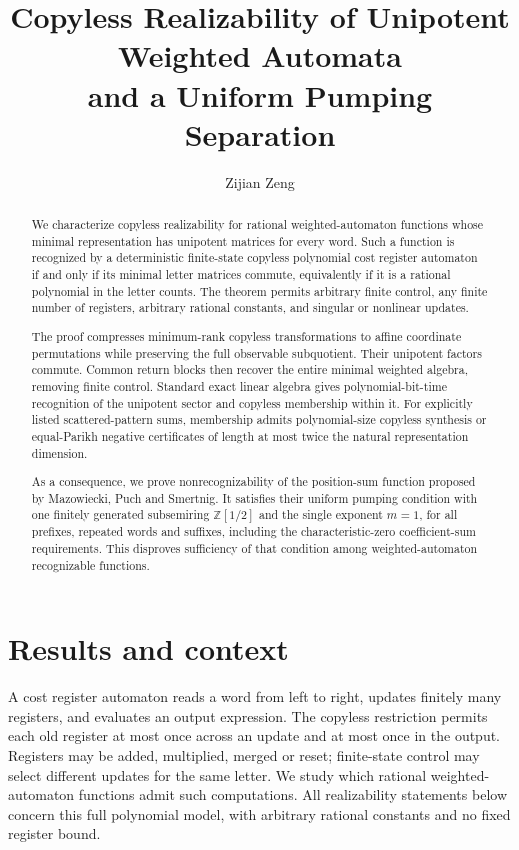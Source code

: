\documentclass[acmlarge,screen,11pt,nonacm]{acmart}
\title[Copyless Realizability and Uniform Pumping]{Copyless Realizability of Unipotent Weighted Automata\texorpdfstring{\\}{ }and a Uniform Pumping Separation}
\author{Zijian Zeng}
\affiliation{\institution{UCSI University}\country{Malaysia}}
\newcommand{\Z}{\mathbb{Z}}
\theoremstyle{definition}
\begin{document}
\begin{abstract}
\normalsize
We characterize copyless realizability for rational weighted-automaton functions whose minimal representation has unipotent matrices for every word. Such a function is recognized by a deterministic finite-state copyless polynomial cost register automaton if and only if its minimal letter matrices commute, equivalently if it is a rational polynomial in the letter counts. The theorem permits arbitrary finite control, any finite number of registers, arbitrary rational constants, and singular or nonlinear updates.

The proof compresses minimum-rank copyless transformations to affine coordinate permutations while preserving the full observable subquotient. Their unipotent factors commute. Common return blocks then recover the entire minimal weighted algebra, removing finite control. Standard exact linear algebra gives polynomial-bit-time recognition of the unipotent sector and copyless membership within it. For explicitly listed scattered-pattern sums, membership admits polynomial-size copyless synthesis or equal-Parikh negative certificates of length at most twice the natural representation dimension.

As a consequence, we prove nonrecognizability of the position-sum function proposed by Mazowiecki, Puch and Smertnig. It satisfies their uniform pumping condition with one finitely generated subsemiring $\Z[1/2]$ and the single exponent $m=1$, for all prefixes, repeated words and suffixes, including the characteristic-zero coefficient-sum requirements. This disproves sufficiency of that condition among weighted-automaton recognizable functions.
\end{abstract}
\maketitle
\thispagestyle{plain}
\clearpage

\section{Results and context}
A cost register automaton reads a word from left to right, updates finitely many registers, and evaluates an output expression. The copyless restriction permits each old register at most once across an update and at most once in the output. Registers may be added, multiplied, merged or reset; finite-state control may select different updates for the same letter. We study which rational weighted-automaton functions admit such computations. All realizability statements below concern this full polynomial model, with arbitrary rational constants and no fixed register bound.
\end{document}
